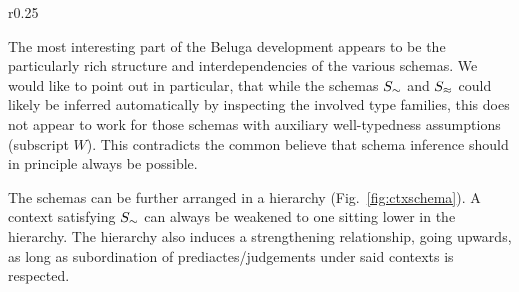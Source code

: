 \begin{wrapfigure}{r}{0.25\textwidth}
  \centering
  \vspace{-0.5em}
  \caption{Hierarchy of Context Schemas}
  \label{fig:ctxschema}
\end{wrapfigure}

The most interesting part of the Beluga development appears to be the particularly rich structure and interdependencies of the various schemas.
We would like to point out in particular, that while the schemas $S_{\mathrel{\sim}}$ and $S_{\mathrel{\approx}}$ could likely be inferred automatically by inspecting the involved type families, this does not appear to work for those schemas with auxiliary well-typedness assumptions (subscript $W$).
This contradicts the common believe that schema inference should in principle always be possible.

The schemas can be further arranged in a hierarchy (Fig.~\ref{fig:ctxschema}).
A context satisfying $S_{\mathrel{\sim}}$ can always be weakened to one sitting lower in the hierarchy.
The hierarchy also induces a strengthening relationship, going upwards, as long as subordination of prediactes/judgements under said contexts is respected.

